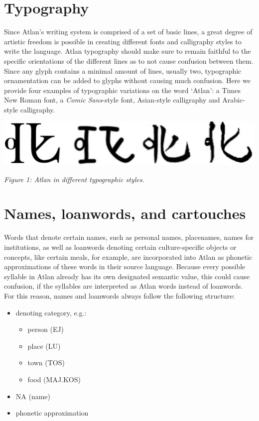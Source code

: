 \section{Typography}



\noindent Since Atlan’s writing system is comprised of a set of basic lines, a great degree of artistic freedom is possible in creating different fonts and calligraphy styles to write the language. Atlan typography should make sure to remain faithful to the specific orientations of the different lines as to not cause confusion between them. Since any glyph contains a minimal amount of lines, usually two, typographic ornamentation can be added to glyphs without causing much confusion. Here we provide four examples of typographic variations on the word ‘Atlan’: a Times New Roman font, a {\it Comic Sans}-style font, Asian-style calligraphy and Arabic-style calligraphy.


\begin{center}
\includegraphics[scale=0.15]{./Images/Atlogos.jpeg}

{\footnotesize \it Figure 1: Atlan in different typographic styles.}
\end{center}
\section{Names, loanwords, and cartouches}

Words that denote certain names, such as personal names, placenames, names for institutions, as well as loanwords denoting certain culture-specific objects or concepts, like certain meals, for example, are incorporated into Atlan as phonetic approximations of these words in their source language. Because every possible syllable in Atlan already has its own designated semantic value, this could cause confusion, if the syllables are interpreted as Atlan words instead of loanwords. For this reason, names and loanwords always follow the following structure: 

\begin{itemize}
	\item denoting category, e.g.: 
		\begin{itemize}
			\item[] person \ej (EJ)
			\item[] place \lu (LU)
			\item[] town \tos (TOS)
			\item[] food \maj \kos (MAJ.KOS)
		\end{itemize}
	\item NA \na (name)
	\item phonetic approximation  

\end{itemize}

